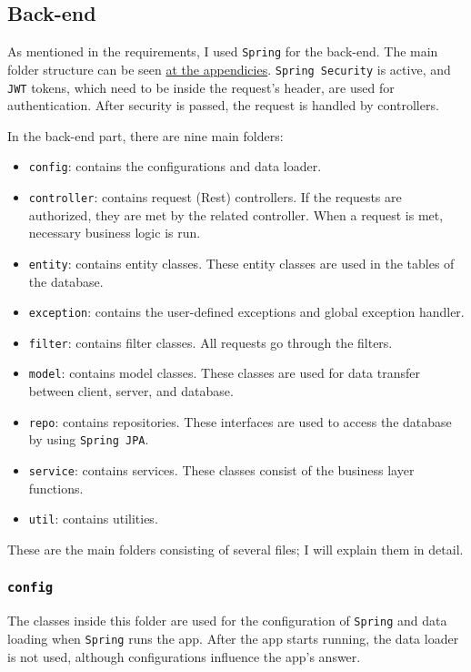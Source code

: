 \subsection{Back-end}

As mentioned in the requirements, I used \texttt{Spring} for the back-end. The main folder structure can be seen \hyperref[back-end-tree]{at the appendicies}. \texttt{Spring Security} is active, and \texttt{JWT} tokens, which need to be inside the request's header, are used for authentication. After security is passed, the request is handled by controllers.

In the back-end part, there are nine main folders:
\begin{itemize}
  \item \texttt{config}: contains the configurations and data loader.
  \item \texttt{controller}: contains request (Rest) controllers. If the requests are authorized, they are met by the related controller. When a request is met, necessary business logic is run.
  \item \texttt{entity}: contains entity classes. These entity classes are used in the tables of the database.
  \item \texttt{exception}: contains the user-defined exceptions and global exception handler.
  \item \texttt{filter}: contains filter classes. All requests go through the filters.
  \item \texttt{model}: contains model classes. These classes are used for data transfer between client, server, and database.
  \item \texttt{repo}: contains repositories. These interfaces are used to access the database by using \texttt{Spring JPA}.
  \item \texttt{service}: contains services. These classes consist of the business layer functions.
  \item \texttt{util}: contains utilities.
\end{itemize}
These are the main folders consisting of several files; I will explain them in detail.


\subsubsection{\texttt{config}}

The classes inside this folder are used for the configuration of \texttt{Spring} and data loading when \texttt{Spring} runs the app. After the app starts running, the data loader is not used, although configurations influence the app's answer.

